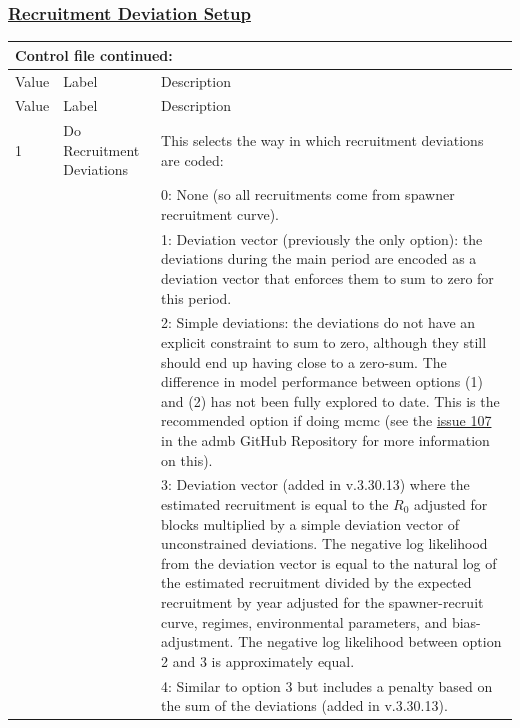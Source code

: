 \hypertarget{RecDevSetup}{}
\subsubsection[Recruitment Deviation Setup]{\protect\hyperlink{RecDevSetup}{Recruitment Deviation Setup}}
\begin{longtable}{p{1cm} p{3cm} p{12cm}}
	\multicolumn{3}{l}{Control file continued:} \\

	\hline
	Value & Label & Description \Tstrut\Bstrut\\
	\hline
	\endfirsthead

	\hline
	Value & Label & Description \Tstrut\Bstrut\\
	\hline
	\endhead
	\hline
	\endfoot
	\endlastfoot


	1 \Tstrut & Do Recruitment Deviations & This selects the way in which recruitment deviations are coded: \\
	  & & 0: None (so all recruitments come from spawner recruitment curve). \\
	  & & 1: Deviation vector (previously the only option): the deviations during the main period are encoded as a deviation vector that enforces them to sum to zero for this period. \\
	  & & 2: Simple deviations: the deviations do not have an explicit constraint to sum to zero, although they still should end up having close to a zero-sum. The difference in model performance between options (1) and (2) has not been fully explored to date. This is the recommended option if doing \gls{mcmc} (see the \href{https://github.com/admb-project/admb/issues/107}{issue 107} in the \gls{admb} GitHub Repository for more information on this). \\
	  & & 3: Deviation vector (added in v.3.30.13) where the estimated recruitment is equal to the $R_{0}$ adjusted for blocks multiplied by a simple deviation vector of unconstrained deviations. The negative log likelihood from the deviation vector is equal to the natural log of the estimated recruitment divided by the expected recruitment by year adjusted for the spawner-recruit curve, regimes, environmental parameters, and bias-adjustment. The negative log likelihood between option 2 and 3 is approximately equal. \\
	  & & 4: Similar to option 3 but includes a penalty based on the sum of the deviations (added in v.3.30.13). \\
	\hline


\end{longtable}
